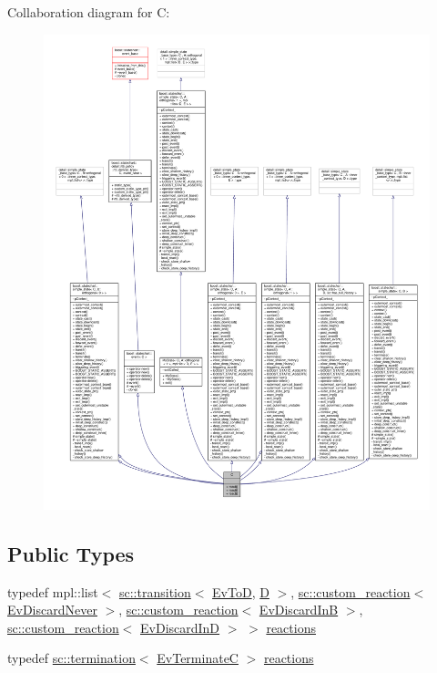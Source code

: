 Collaboration diagram for C\+:
\nopagebreak
\begin{figure}[H]
\begin{center}
\leavevmode
\includegraphics[width=350pt]{struct_c__coll__graph}
\end{center}
\end{figure}
\subsection*{Public Types}
\begin{DoxyCompactItemize}
\item 
typedef mpl\+::list$<$ \mbox{\hyperlink{classboost_1_1statechart_1_1transition}{sc\+::transition}}$<$ \mbox{\hyperlink{struct_ev_to_d}{Ev\+ToD}}, \mbox{\hyperlink{struct_d}{D}} $>$, \mbox{\hyperlink{classboost_1_1statechart_1_1custom__reaction}{sc\+::custom\+\_\+reaction}}$<$ \mbox{\hyperlink{struct_ev_discard_never}{Ev\+Discard\+Never}} $>$, \mbox{\hyperlink{classboost_1_1statechart_1_1custom__reaction}{sc\+::custom\+\_\+reaction}}$<$ \mbox{\hyperlink{struct_ev_discard_in_b}{Ev\+Discard\+InB}} $>$, \mbox{\hyperlink{classboost_1_1statechart_1_1custom__reaction}{sc\+::custom\+\_\+reaction}}$<$ \mbox{\hyperlink{struct_ev_discard_in_d}{Ev\+Discard\+InD}} $>$ $>$ \mbox{\hyperlink{struct_c_a1891987db7cdbea5f19084087b9174fa}{reactions}}
\item 
typedef \mbox{\hyperlink{classboost_1_1statechart_1_1termination}{sc\+::termination}}$<$ \mbox{\hyperlink{struct_ev_terminate_c}{Ev\+TerminateC}} $>$ \mbox{\hyperlink{struct_c_ab8b632236e00c355feedf0213d217543}{reactions}}
\end{DoxyCompactItemize}
